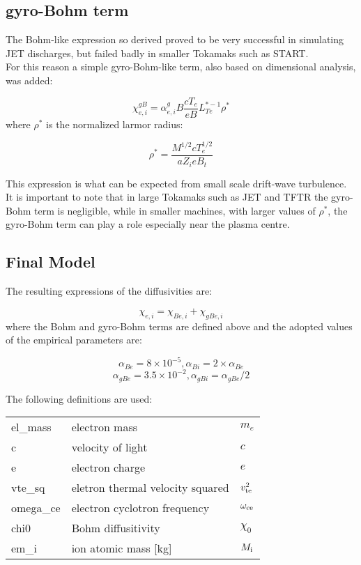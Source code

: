 \documentclass{article}    %
\begin{document}
\subsection{gyro-Bohm term}

The Bohm-like expression so derived proved to be very successful
in simulating JET discharges, but failed badly in smaller Tokamaks
such as START\cite{roa96}.\\
For this reason a simple gyro-Bohm-like term, also based on 
dimensional analysis, was added:

\[ \chi_{e,i}^{gB} = \alpha_{e,i}^gB \frac{cT_e}{eB} L_{Te}^{*-1} \rho^*\]
where $\rho^*$ is the normalized larmor radius:

\[ \rho^* =  \frac {M^{1/2}cT_e^{1/2}}{aZ_ieB_t}\]

This expression is what can be expected from small scale
drift-wave turbulence. It is important to note that in large
Tokamaks such as JET and TFTR the gyro-Bohm term is negligible,
while in smaller machines, with larger values of $\rho^*$, the
gyro-Bohm term can play a role especially near the plasma centre.\hfill 

\subsection{Final Model}
The resulting expressions of the diffusivities are:

\[ \chi_{e,i}=\chi_{Be,i}+\chi_{gBe,i}\]
where the Bohm and gyro-Bohm terms are defined above and the adopted values
of the empirical parameters are:\hfill

\[ \alpha_{Be} = 8\times10^{-5} ,\alpha_{Bi} = 2\times\alpha_{Be}\]
\[ \alpha_{gBe} = 3.5\times10^{-2} , \alpha_{gBi} = \alpha_{gBe}/2\]\vskip8pt


The following definitions are used:\vskip8pt

\begin{tabular}{lll}
el\_mass &electron mass    &$m_e$ \\
c       &velocity of light &$c$ \\
e       &electron charge  &$e$\\
vte\_sq &eletron thermal velocity squared &$v_{\rm te}^2$\\
omega\_ce &electron cyclotron frequency &$\omega_{\rm ce}$\\
chi0 &Bohm diffusitivity & $\chi_0$\\
em\_i & ion atomic mass [kg] & $M_{\rm i}$\\
\end{tabular}\vskip8pt
\end{document}
